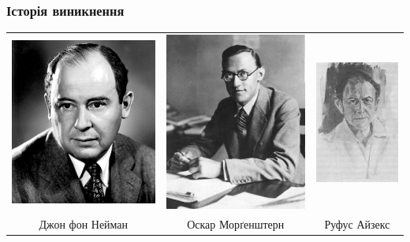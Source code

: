 \documentclass[10pt,pdf]{beamer}
\begin{document}
    \begin{frame}
        \frametitle{Історія виникнення}
        \begin{tabular}{c c c}
            \includegraphics[scale=0.275]{../pics/John_von_Neumann.jpg} &
            \includegraphics[scale=0.4]{../pics/Oskar_Morgenstern.jpg} &
            \includegraphics[scale=0.42]{../pics/Rufus_Isaacs.jpg} \\
            Джон фон Нейман &
            Оскар Морґенштерн &
            Руфус Айзекс
        \end{tabular}
    \end{frame}
\end{document}
